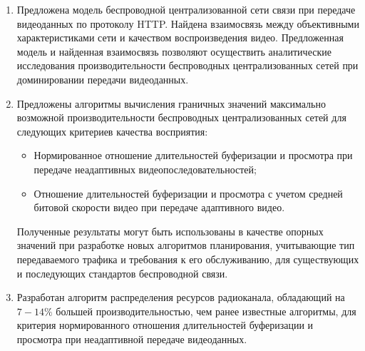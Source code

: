 \begin{enumerate}
    \item Предложена модель беспроводной централизованной сети связи при передаче видеоданных по протоколу HTTP. Найдена взаимосвязь между объективными характеристиками сети и качеством воспроизведения видео. Предложенная модель и найденная взаимосвязь позволяют осуществить аналитические исследования производительности беспроводных централизованных сетей при доминировании передачи видеоданных.
    \item Предложены алгоритмы вычисления граничных значений максимально возможной производительности беспроводных централизованных сетей для следующих критериев качества восприятия:
    \begin{itemize}
	    \item Нормированное отношение длительностей буферизации и просмотра при передаче неадаптивных видеопоследовательностей;
	    \item Отношение длительностей буферизации и просмотра с учетом средней битовой скорости видео при передаче адаптивного видео.
    \end{itemize}
    Полученные результаты могут быть использованы в качестве опорных значений при разработке новых алгоритмов планирования, учитывающие тип передаваемого трафика и требования к его обслуживанию, для существующих и последующих стандартов беспроводной связи.
    \item Разработан алгоритм распределения ресурсов радиоканала, обладающий на $7-14\%$ большей производительностью, чем ранее известные алгоритмы, для критерия нормированного отношения длительностей буферизации и просмотра при неадаптивной передаче видеоданных.
\end{enumerate}
